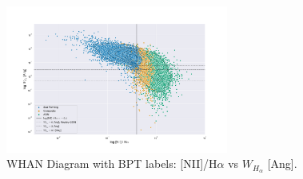 \documentclass[letterpaper, oneside]{article}
\begin{document}
	\begin{figure}[H]
		\centering
		\includegraphics[width=0.65\textwidth]{../WHAN_diagrams/WHAN_diagram.pdf}
		\caption{WHAN Diagram with BPT labels: [NII]/H$\alpha$ vs $W_{H_{\alpha}}$ [Ang].}
		\label{fig:WHAN_BPT_labels}
	\end{figure}
\end{document}
